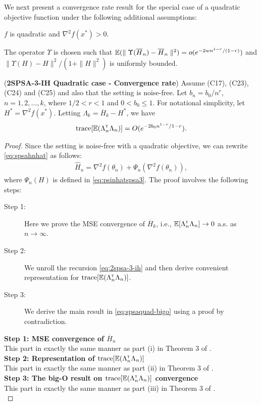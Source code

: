 We next present a convergence rate result for the special case of a quadratic objective function under the following additional assumptions:
\begin{pvn}
\item  $f$ is quadratic and $\nabla^2 f(x^*) > 0$. 
\item The operator $\Upsilon$ is chosen such that $\mathbb{E}(\parallel \Upsilon(\overline H_n) - \overline H_n\parallel^2) = o(e^{-2wn^{1-r}/(1-r)})$ and $\parallel \Upsilon(H) - H \parallel^2 / (1+\parallel H \parallel^2)$ is uniformly bounded.
\end{pvn}
\begin{theorem}(\textbf{2SPSA-3-IH Quadratic case - Convergence rate})
\label{thm:spsaquad-bound}
Assume (C17), (C23), (C24) and (C25) and also that the setting is noise-free. 
Let $b_n = b_0/n^r$, $n=1,2,\ldots,k$, where $1/2 < r < 1$ and $0 < b_0 \leq 1$. For notational simplicity, let $H^*=\nabla^2 f(x^*)$. Letting $\Lambda_k = \overline H_k - H^*$, we have 
\begin{align}
\text{trace}[\mathbb{E} (\Lambda_n ^\mathsf{\scriptscriptstyle T} \Lambda_n)] = O(e^{-2b_0n^{1-r} / {1-r}}).
\label{eq:spsaquad-bigo}
\end{align}
\end{theorem}
\begin{proof}
Since the setting is noise-free with a quadratic objective, we can rewrite \eqref{eq:spsahnhat} as follows:
\begin{align}
 \widehat H_n =    \nabla^2 f(\theta_n) +\Psi_{n}(\nabla^2 f(\theta_n)),\label{eq:spsahnhat-ext}
\end{align}
where $\Psi_n(H)$ is defined in \eqref{eq:psinhatspsa3}.
The proof involves the following steps:
\begin{description}
  \item[Step 1:] Here we prove the MSE convergence of $\overline H_k$, i.e., $\mathbb{E} [\Lambda_n^\mathsf{\scriptscriptstyle T} \Lambda_n] \rightarrow 0$ a.s. as $n\rightarrow \infty$.
  \item[Step 2:] We unroll the recursion \eqref{eq:2spsa-3-ih} and then derive convenient representation for $\text{trace}[\mathbb{E} (\Lambda_n ^\mathsf{\scriptscriptstyle T} \Lambda_n)]$.
  \item[Step 3:] We derive the main result in \eqref{eq:spsaquad-bigo} using a proof by contradiction. 
\end{description}
\noindent\textbf{Step 1: MSE convergence of $\overline H_n$} \\
This part in exactly the same manner as part (i) in Theorem 3 of \cite{spall-jacobian}.\\
\noindent\textbf{Step 2: Representation of $\text{trace}[\mathbb{E} (\Lambda_n ^\mathsf{\scriptscriptstyle T} \Lambda_n)]$} \\
This part in exactly the same manner as part (ii) in Theorem 3 of \cite{spall-jacobian}.\\
\noindent\textbf{Step 3: The big-O result on $\text{trace}[\mathbb{E} (\Lambda_n ^\mathsf{\scriptscriptstyle T} \Lambda_n)]$ convergence} \\
This part in exactly the same manner as part (iii) in Theorem 3 of \cite{spall-jacobian}.\\
\end{proof}



